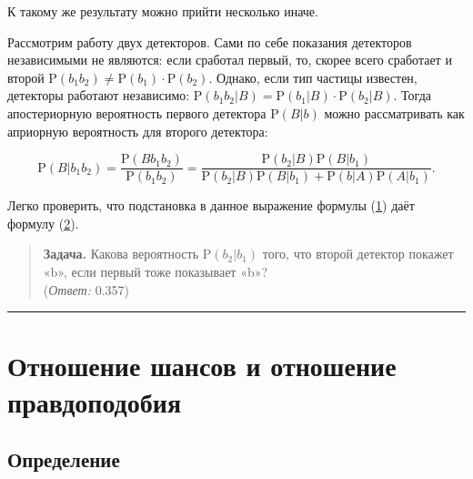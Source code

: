 \documentclass[11pt,a4paper]{article}
\begin{document}
    К такому же результату можно прийти несколько иначе.

Рассмотрим работу двух детекторов. Сами по себе показания детекторов
независимыми не являются: если сработал первый, то, скорее всего
сработает и второй
\(\mathrm{P}(b_1b_2) \ne \mathrm{P}(b_1) \cdot \mathrm{P}(b_2)\).
Однако, если тип частицы известен, детекторы работают независимо:
\(\mathrm{P}(b_1b_2|B) = \mathrm{P}(b_1|B) \cdot \mathrm{P}(b_2|B)\).
Тогда апостериорную вероятность первого детектора \(\mathrm{P}(B|b)\)
можно рассматривать как априорную вероятность для второго детектора:

\[
  \mathrm{P}(B|b_1 b_2) = \dfrac{\mathrm{P}(B b_1 b_2)}{\mathrm{P}(b_1 b_2)} = \dfrac{\mathrm{P}(b_2|B)\mathrm{P}(B|b_1)}{\mathrm{P}(b_2|B)\mathrm{P}(B|b_1) + \mathrm{P}(b|A)\mathrm{P}(A|b_1)}.
\]

Легко проверить, что подстановка в данное выражение формулы
(\hyperref[mjx-eqn-eqpbb]{1}) даёт формулу
(\hyperref[mjx-eqn-eqpbbb]{2}).

    \begin{quote}
\textbf{Задача.} Какова вероятность \(\mathrm{P}(b_2|b_1)\) того, что
второй детектор покажет «b», если первый тоже показывает «b»?\\
(\emph{Ответ:} 0.357)
\end{quote}

    \begin{center}\rule{0.5\linewidth}{0.5pt}\end{center}

    \hypertarget{ux43eux442ux43dux43eux448ux435ux43dux438ux435-ux448ux430ux43dux441ux43eux432-ux43eux442ux43dux43eux448ux435ux43dux438ux435-ux43fux440ux430ux432ux434ux43eux43fux43eux434ux43eux431ux438ux44f}{%
\section{Отношение шансов и отношение
правдоподобия}\label{ux43eux442ux43dux43eux448ux435ux43dux438ux435-ux448ux430ux43dux441ux43eux432-ux43eux442ux43dux43eux448ux435ux43dux438ux435-ux43fux440ux430ux432ux434ux43eux43fux43eux434ux43eux431ux438ux44f}}

    \hypertarget{ux43eux43fux440ux435ux434ux435ux43bux435ux43dux438ux435}{%
\subsection{Определение}\label{ux43eux43fux440ux435ux434ux435ux43bux435ux43dux438ux435}}
\end{document}
